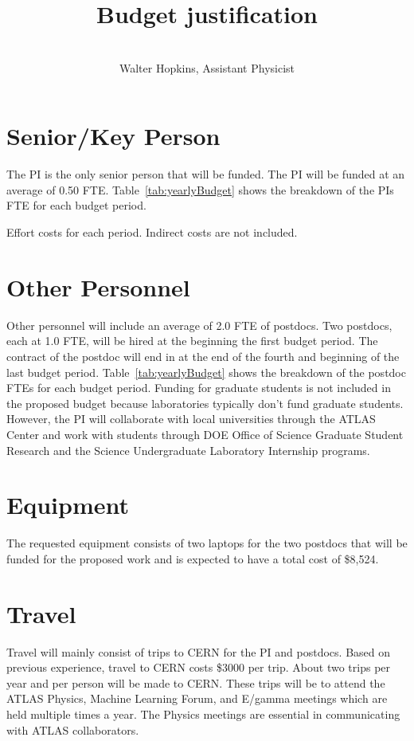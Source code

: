 \documentclass[letter, USenglish, 11pt, subfigure]{article}
\title{Budget justification}
\author{\\ Walter Hopkins, Assistant Physicist\\
}
\date{}
\begin{document}
\maketitle
\thispagestyle{firststyle}

\section{Senior/Key Person}
\label{subsec:keyPerson}
The PI is the only senior person that will be funded. The PI will be funded at an average of 0.50 FTE. Table~\ref{tab:yearlyBudget} shows the breakdown of the PIs FTE for each budget period.

\begin{table}[!htpb]
  \begin{center}
    \caption{Effort costs for each period. Indirect costs are not included.}
      \label{tab:yearlyBudget}
  
  \end{center}
\end{table}

\section{Other Personnel}
\label{subsec:personnel}
Other personnel will include an average of 2.0 FTE of postdocs. Two postdocs, each at 1.0 FTE, will be hired at the beginning the first budget period. The contract of the postdoc will end in at the end of the fourth and beginning of the last budget period. Table~\ref{tab:yearlyBudget} shows the breakdown of the postdoc FTEs for each budget period. Funding for graduate students is not included in the proposed budget because laboratories typically don't fund graduate students. However, the PI will collaborate with local universities through the ATLAS Center and work with students through DOE Office of Science Graduate Student Research and the Science Undergraduate Laboratory Internship programs.

\clearpage
\section{Equipment}
\label{subsec:Equipment}
The requested equipment consists of two laptops for the two postdocs that will be funded for the proposed work and is expected to have a total cost of \$8,524. 

\section{Travel}
\label{subsec:travel}
Travel will mainly consist of trips to CERN for the PI and postdocs. Based on previous experience, travel to CERN costs \$3000 per trip. About two trips per year and per person will be made to CERN. These trips will be to attend the ATLAS Physics, Machine Learning Forum, and E/gamma meetings which are held multiple times a year. The Physics meetings are essential in communicating with ATLAS collaborators.
\end{document}
